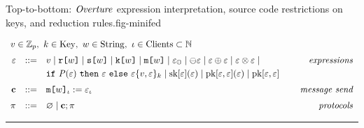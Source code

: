 \begin{fpfig}[t]{Top-to-bottom: $\mathit{Overture}$ expression interpretation, source code restrictions on keys, and reduction rules.}{fig-minifed}
  {\small
    $$
    \begin{array}{rcl@{\hspace{8mm}}r}
      \multicolumn{4}{l}{v \in \mathbb{Z}_p,\ k \in \mathrm{Key},\ w \in \mathrm{String},\ \cid \in \mathrm{Clients} \subset  \mathbb{N} }\\[2mm] %
      \be &::=& v \mid \flip{w} \mid \secret{w} \mid \key{w} \mid \mesg{w} \mid \elab{\be}{\Oracle} \mid \ominus \be \mid \be \oplus \be \mid \be \otimes \be \mid & \textit{expressions}\\[1mm]
      & &  \select{\fp(\be)}{\be}{\be} \ctxt{v,\be}{k}  \mid \sk{\be}(\be) \mid \pk{\be}{\be}(\be) \mid \pk{\be}{\be} \\[2mm]
      \instr &::=& \eassign{\mesg{w}}{\cid}{\be}{\cid} & \textit{message send} \\[2mm]
      \prog &::=& \varnothing \mid \instr; \prog & \textit{protocols}
    \end{array}
    $$
  
  \rule{130mm}{0.5pt}

}
\end{fpfig}
